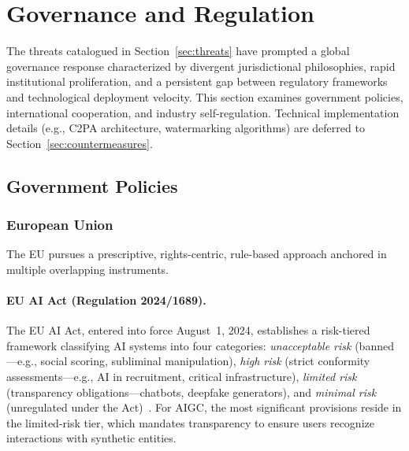 
\section{Governance and Regulation}
\label{sec:governance}

The threats catalogued in Section~\ref{sec:threats} have prompted a global governance response characterized by divergent jurisdictional philosophies, rapid institutional proliferation, and a persistent gap between regulatory frameworks and technological deployment velocity. This section examines government policies, international cooperation, and industry self-regulation. Technical implementation details (e.g., C2PA architecture, watermarking algorithms) are deferred to Section~\ref{sec:countermeasures}.


\subsection{Government Policies}
\label{sec:gov-policy}

\subsubsection{European Union}
\label{sec:gov-eu}

The EU pursues a prescriptive, rights-centric, rule-based approach anchored in multiple overlapping instruments.

\paragraph{EU AI Act (Regulation 2024/1689).}
The EU AI Act, entered into force August~1, 2024, establishes a risk-tiered framework classifying AI systems into four categories: \emph{unacceptable risk} (banned---e.g., social scoring, subliminal manipulation), \emph{high risk} (strict conformity assessments---e.g., AI in recruitment, critical infrastructure), \emph{limited risk} (transparency obligations---chatbots, deepfake generators), and \emph{minimal risk} (unregulated under the Act)~\cite{euaiact2024}. For AIGC, the most significant provisions reside in the limited-risk tier, which mandates transparency to ensure users recognize interactions with synthetic entities.

